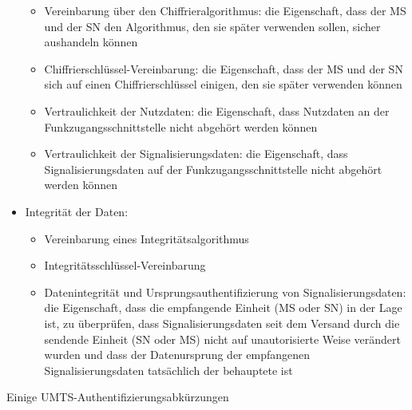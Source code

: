 \documentclass[a4paper]{article}
\begin{document}
\begin{multicols}{3}
\begin{itemize}
              \begin{itemize}
                  \item
                        Vereinbarung über den Chiffrieralgorithmus: die Eigenschaft, dass
                        der MS und der SN den Algorithmus, den sie später verwenden sollen,
                        sicher aushandeln können
                  \item
                        Chiffrierschlüssel-Vereinbarung: die Eigenschaft, dass der MS und
                        der SN sich auf einen Chiffrierschlüssel einigen, den sie später
                        verwenden können
                  \item
                        Vertraulichkeit der Nutzdaten: die Eigenschaft, dass Nutzdaten an
                        der Funkzugangsschnittstelle nicht abgehört werden können
                  \item
                        Vertraulichkeit der Signalisierungsdaten: die Eigenschaft, dass
                        Signalisierungsdaten auf der Funkzugangsschnittstelle nicht abgehört
                        werden können
              \end{itemize}
        \item
              Integrität der Daten:

              \begin{itemize}
                  \item
                        Vereinbarung eines Integritätsalgorithmus
                  \item
                        Integritätsschlüssel-Vereinbarung
                  \item
                        Datenintegrität und Ursprungsauthentifizierung von
                        Signalisierungsdaten: die Eigenschaft, dass die empfangende Einheit
                        (MS oder SN) in der Lage ist, zu überprüfen, dass
                        Signalisierungsdaten seit dem Versand durch die sendende Einheit (SN
                        oder MS) nicht auf unautorisierte Weise verändert wurden und dass
                        der Datenursprung der empfangenen Signalisierungsdaten tatsächlich
                        der behauptete ist
              \end{itemize}
    \end{itemize}

    Einige UMTS-Authentifizierungsabkürzungen


\end{multicols}
\end{document}
